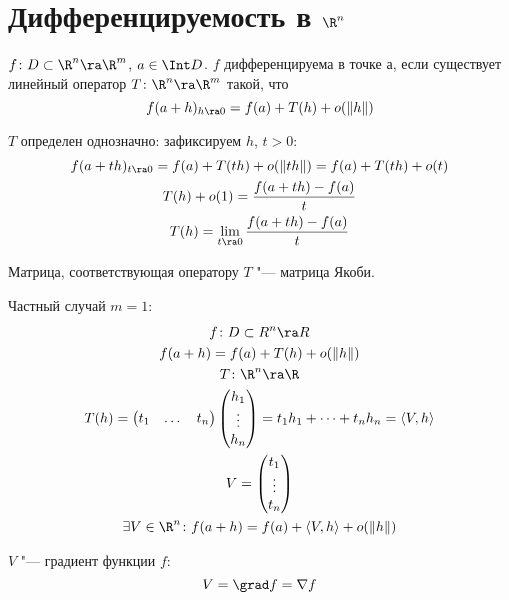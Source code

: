 \section{Дифференцируемость в \texorpdfstring{$\R^n$}{R\textasciicircum{}n}}

\begin{Def}
	$f \colon D \subset \R^n \ra \R^m$, $a \in \Int D$.
	$f$ дифференцируема в точке $а$, если существует линейный оператор $T\colon \R^n \ra \R^m$ такой, что
	\[ f(a + h)_{h \ra 0} = f(a) + T(h) + o(\|h\|) \]
\end{Def}
\begin{Rem}
	$T$ определен однозначно: зафиксируем $h$, $t > 0$:
	\begin{gather*}
		f(a + th)_{t \ra 0} = f(a) + T(th) + o(\|th\|) = f(a) + T(th) + o(t) \\
		T(h) + o(1) = \frac{f(a + th) - f(a)}{t} \\
		T(h) = \lim_{t \ra 0} \frac{f(a + th) - f(a)}{t}
	\end{gather*}
\end{Rem}

\begin{Def}
	Матрица, соответствующая оператору $T$ "--- матрица Якоби.
\end{Def}
Частный случай $m = 1$:
\begin{gather*}
	f \colon D \subset R^n \ra R \\
	f(a + h) = f(a) + T(h) + o(\|h\|) \\
	T \colon \R^n \ra \R \\
	T(h) =
		\begin{pmatrix}
			t_1 & \dots & t_n
		\end{pmatrix}
		\begin{pmatrix}
			h_1\\
			\vdots \\
			h_n
		\end{pmatrix}
		= t_1h_1 + \dots + t_nh_n = \left< V, h \right> \\
	V =
		\begin{pmatrix}
			t_1\\
			\vdots \\
			t_n
		\end{pmatrix} \\
	\exists V \in \R^n \colon f(a + h) = f(a) + \left< V, h \right> + o(\|h\|) \\
\end{gather*}

\begin{Def}
	$V$ "--- градиент функции $f$:
	\[ V = \grad f = \nabla f \]
\end{Def}

